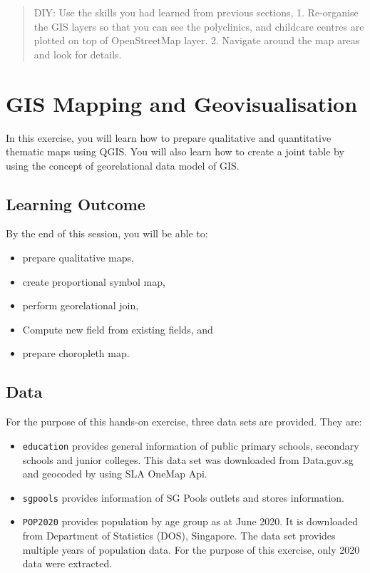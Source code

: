 \documentclass[
  letterpaper,
  DIV=11,
  numbers=noendperiod]{scrreprt}
\providecommand{\tightlist}{%
  \setlength{\itemsep}{0pt}\setlength{\parskip}{0pt}}\usepackage{longtable,booktabs,array}
\begin{document}
\begin{quote}
DIY: Use the skills you had learned from previous sections, 1.
Re-organise the GIS layers so that you can see the polyclinics, and
childcare centres are plotted on top of OpenStreetMap layer. 2. Navigate
around the map areas and look for details.
\end{quote}


\hypertarget{gis-mapping-and-geovisualisation}{%
\chapter{GIS Mapping and
Geovisualisation}\label{gis-mapping-and-geovisualisation}}

In this exercise, you will learn how to prepare qualitative and
quantitative thematic maps using QGIS. You will also learn how to create
a joint table by using the concept of georelational data model of GIS.

\hypertarget{learning-outcome-1}{%
\section{Learning Outcome}\label{learning-outcome-1}}

By the end of this session, you will be able to:

\begin{itemize}
\tightlist
\item
  prepare qualitative maps,
\item
  create proportional symbol map,
\item
  perform georelational join,
\item
  Compute new field from existing fields, and
\item
  prepare choropleth map.
\end{itemize}

\hypertarget{data}{%
\section{Data}\label{data}}

For the purpose of this hands-on exercise, three data sets are provided.
They are:

\begin{itemize}
\tightlist
\item
  \texttt{education} provides general information of public primary
  schools, secondary schools and junior colleges. This data set was
  downloaded from Data.gov.sg and geocoded by using SLA OneMap Api.
\item
  \texttt{sgpools} provides information of SG Pools outlets and stores
  information.
\item
  \texttt{POP2020} provides population by age group as at June 2020. It
  is downloaded from Department of Statistics (DOS), Singapore. The data
  set provides multiple years of population data. For the purpose of
  this exercise, only 2020 data were extracted.
\end{itemize}
\end{document}

